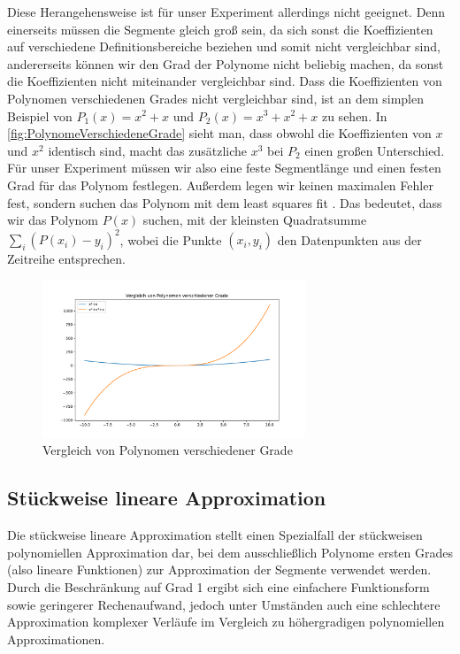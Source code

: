 Diese Herangehensweise ist für unser Experiment allerdings nicht geeignet. Denn einerseits müssen die Segmente gleich groß sein, da sich sonst die Koeffizienten auf verschiedene Definitionsbereiche beziehen und somit nicht vergleichbar sind, andererseits können wir den Grad der Polynome nicht beliebig machen, da sonst die Koeffizienten nicht miteinander vergleichbar sind. Dass die Koeffizienten von Polynomen verschiedenen Grades nicht vergleichbar sind, ist an dem simplen Beispiel von $P_1(x)=x^2+x$ und $P_2(x)=x^3+x^2+x$ zu sehen. In \autoref{fig:PolynomeVerschiedeneGrade} sieht man, dass obwohl die Koeffizienten von $x$ und $x^2$ identisch sind, macht das zusätzliche $x^3$ bei $P_2$ einen großen Unterschied. Für unser Experiment müssen wir also eine feste Segmentlänge und einen festen Grad für das Polynom festlegen. Außerdem legen wir keinen maximalen Fehler fest, sondern suchen das Polynom mit dem least squares fit \cite[Def. least squares fitting]{end}. Das bedeutet, dass wir das Polynom $P(x)$ suchen, mit der kleinsten Quadratsumme $\sum_i (P(x_i)-y_i)^2$, wobei die Punkte $(x_i,y_i)$ den Datenpunkten aus der Zeitreihe entsprechen.
\begin{figure}[bth] 
  \centering
  \includegraphics[width=0.7\textwidth]{Graphics/ComparissonDifferentPolDegrees.pdf}
  \caption{Vergleich von Polynomen verschiedener Grade}
  \label{fig:PolynomeVerschiedeneGrade}
\end{figure}

\subsection{Stückweise lineare Approximation}
Die stückweise lineare Approximation stellt einen Spezialfall der stückweisen polynomiellen Approximation dar, bei dem ausschließlich Polynome ersten Grades (also lineare Funktionen) zur Approximation der Segmente verwendet werden.
Durch die Beschränkung auf Grad 1 ergibt sich eine einfachere Funktionsform sowie geringerer Rechenaufwand, jedoch unter Umständen auch eine schlechtere Approximation komplexer Verläufe im Vergleich zu höhergradigen polynomiellen Approximationen.

